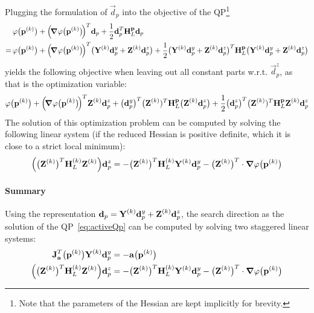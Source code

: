 				Plugging the formulation of \( \vec{d}_p \) into the objective of the QP\footnote{Note that the parameters of the Hessian are kept implicitly for brevity.}
				\begin{align*}
					&\, \varphi\big(\boldsymbol{\mathrm{p}}^{(k)}\big) + \Big(\!\grad{\varphi}\big(\boldsymbol{\mathrm{p}}^{(k)}\big)\!\Big)^T \boldsymbol{\mathrm{d}}_p + \frac{1}{2} \boldsymbol{\mathrm{d}}_p^T \boldsymbol{\mathrm{H}}_L^{\boldsymbol{\mathrm{p}}} \boldsymbol{\mathrm{d}}_p \\
					=&\, \varphi\big(\boldsymbol{\mathrm{p}}^{(k)}\big) + \Big(\!\grad{\varphi}\big(\boldsymbol{\mathrm{p}}^{(k)}\big)\!\Big)^T \big( \boldsymbol{\mathrm{Y}}^{(k)} \boldsymbol{\mathrm{d}}_p^y + \boldsymbol{\mathrm{Z}}^{(k)} \boldsymbol{\mathrm{d}}_p^z \big) + \frac{1}{2} \big( \boldsymbol{\mathrm{Y}}^{(k)} \boldsymbol{\mathrm{d}}_p^y + \boldsymbol{\mathrm{Z}}^{(k)} \boldsymbol{\mathrm{d}}_p^z \big)^T \boldsymbol{\mathrm{H}}_L^{\boldsymbol{\mathrm{p}}} \big( \boldsymbol{\mathrm{Y}}^{(k)} \boldsymbol{\mathrm{d}}_p^y + \boldsymbol{\mathrm{Z}}^{(k)} \boldsymbol{\mathrm{d}}_p^z \big)
				\end{align*}
				yields the following objective when leaving out all constant parts w.r.t. \( \vec{d}_p^z \), as that is the optimization variable:
				\begin{align*}
					\varphi\big(\boldsymbol{\mathrm{p}}^{(k)}\big) + \Big(\!\grad{\varphi}\big(\boldsymbol{\mathrm{p}}^{(k)}\big)\!\Big)^T \boldsymbol{\mathrm{Z}}^{(k)} \boldsymbol{\mathrm{d}}_p^z + \big(\boldsymbol{\mathrm{d}}_p^y\big)^T \big(\boldsymbol{\mathrm{Z}}^{(k)})^T \boldsymbol{\mathrm{H}}_L^{\boldsymbol{\mathrm{p}}} \big( \boldsymbol{\mathrm{Z}}^{(k)} \boldsymbol{\mathrm{d}}_p^z \big) + \frac{1}{2} \big(\boldsymbol{\mathrm{d}}_p^z\big)^T \big(\boldsymbol{\mathrm{Z}}^{(k)})^T \boldsymbol{\mathrm{H}}_L^{\boldsymbol{\mathrm{p}}} \boldsymbol{\mathrm{Z}}^{(k)} \boldsymbol{\mathrm{d}}_p^z
				\end{align*}
				The solution of this optimization problem can be computed by solving the following linear system (if the reduced Hessian is positive definite, which it is close to a strict local minimum):
				\begin{align*}
					\Big( \big(\boldsymbol{\mathrm{Z}}^{(k)}\big)^T \boldsymbol{\mathrm{H}}_L^{(k)} \boldsymbol{\mathrm{Z}}^{(k)} \Big) \boldsymbol{\mathrm{d}}_p^z = -\big(\boldsymbol{\mathrm{Z}}^{(k)}\big)^T \boldsymbol{\mathrm{H}}_L^{(k)} \boldsymbol{\mathrm{Y}}^{(k)} \boldsymbol{\mathrm{d}}_p^y - \big(\boldsymbol{\mathrm{Z}}^{(k)}\big)^T \cdot \grad{\varphi}\big(\boldsymbol{\mathrm{p}}^{(k)}\big)
				\end{align*}
				
				\paragraph{Summary}
					Using the representation \( \boldsymbol{\mathrm{d}}_p = \boldsymbol{\mathrm{Y}}^{(k)} \boldsymbol{\mathrm{d}}_p^y + \boldsymbol{\mathrm{Z}}^{(k)} \boldsymbol{\mathrm{d}}_p^z \), the search direction as the solution of the QP~\eqref{eq:activeQp} can be computed by solving two staggered linear systems:
					\begin{align*}
						\boldsymbol{\mathrm{J}}_{\boldsymbol{\mathrm{a}}}^T\big(\boldsymbol{\mathrm{p}}^{(k)}\big) \boldsymbol{\mathrm{Y}}^{(k)} \boldsymbol{\mathrm{d}}_p^y &= -\boldsymbol{\mathrm{a}}\big(\boldsymbol{\mathrm{p}}^{(k)}\big) \\
						\Big( \big(\boldsymbol{\mathrm{Z}}^{(k)}\big)^T \boldsymbol{\mathrm{H}}_L^{(k)} \boldsymbol{\mathrm{Z}}^{(k)} \Big) \boldsymbol{\mathrm{d}}_p^z &= -\big(\boldsymbol{\mathrm{Z}}^{(k)}\big)^T \boldsymbol{\mathrm{H}}_L^{(k)} \boldsymbol{\mathrm{Y}}^{(k)} \boldsymbol{\mathrm{d}}_p^y - \big(\boldsymbol{\mathrm{Z}}^{(k)}\big)^T \cdot \grad{\varphi}\big(\boldsymbol{\mathrm{p}}^{(k)}\big)
					\end{align*}
					
